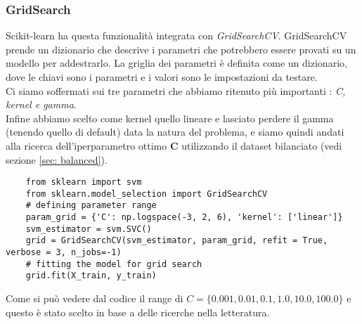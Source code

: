 \documentclass[../../Report.tex]{subfiles}
\begin{document}
    \subsubsection{GridSearch}
    Scikit-learn ha questa funzionalità integrata con \emph{GridSearchCV}. GridSearchCV prende un dizionario che descrive i parametri che potrebbero essere provati su un modello per addestrarlo. La griglia dei parametri è definita come un dizionario, dove le chiavi sono i parametri e i valori sono le impostazioni da testare. \\
    Ci siamo soffermati sui tre parametri che abbiamo ritenuto più importanti : \emph{C, kernel e gamma}.\\
    Infine abbiamo scelto come kernel quello lineare e lasciato perdere il gamma (tenendo quello di default) data la natura del problema, e siamo quindi andati alla ricerca dell'iperparametro ottimo \textbf{C} utilizzando il dataset bilanciato (vedi sezione \ref{sec: balanced}).
\begin{lstlisting}
    from sklearn import svm
    from sklearn.model_selection import GridSearchCV
    # defining parameter range 
    param_grid = {'C': np.logspace(-3, 2, 6), 'kernel': ['linear']}  
    svm_estimator = svm.SVC()
    grid = GridSearchCV(svm_estimator, param_grid, refit = True, verbose = 3, n_jobs=-1) 
    # fitting the model for grid search 
    grid.fit(X_train, y_train) \end{lstlisting}
    Come si può vedere dal codice il range di $C = \{0.001, 0.01, 0.1, 1.0, 10.0, 100.0\}$ e questo è stato scelto in base a delle ricerche nella letteratura.
    
\end{document}
